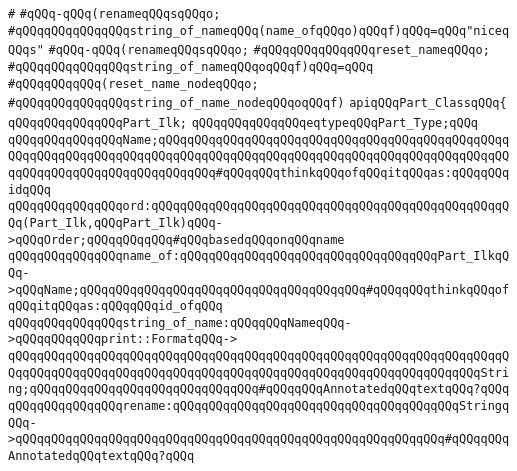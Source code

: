 \verb|#|\newline
\verb|#qQQq-qQQq(renameqQQqsqQQqo;|\newline
\verb|#qQQqqQQqqQQqqQQqstring_of_nameqQQq(name_ofqQQqo)qQQqf)qQQq=qQQq"niceqQQqs"|\newline
\verb|#qQQq-qQQq(renameqQQqsqQQqo;|\newline
\verb|#qQQqqQQqqQQqqQQqreset_nameqQQqo;|\newline
\verb|#qQQqqQQqqQQqqQQqstring_of_nameqQQqoqQQqf)qQQq=qQQq|\newline
\verb|#qQQqqQQqqQQq(reset_name_nodeqQQqo;|\newline
\verb|#qQQqqQQqqQQqqQQqstring_of_name_nodeqQQqoqQQqf)|\newline
\newline
\newline
\newline
\newline
\newline
\verb|apiqQQqPart_ClassqQQq{|\newline
\newline
\verb|qQQqqQQqqQQqqQQqPart_Ilk;|\newline
\verb|qQQqqQQqqQQqqQQqeqtypeqQQqPart_Type;qQQq|\newline
\verb|qQQqqQQqqQQqqQQqName;qQQqqQQqqQQqqQQqqQQqqQQqqQQqqQQqqQQqqQQqqQQqqQQqqQQqqQQqqQQqqQQqqQQqqQQqqQQqqQQqqQQqqQQqqQQqqQQqqQQqqQQqqQQqqQQqqQQqqQQqqQQqqQQqqQQqqQQqqQQqqQQqqQQq#qQQqqQQqthinkqQQqofqQQqitqQQqas:qQQqqQQqidqQQq|\newline
\newline
\verb|qQQqqQQqqQQqqQQqord:qQQqqQQqqQQqqQQqqQQqqQQqqQQqqQQqqQQqqQQqqQQqqQQqqQQq(Part_Ilk,qQQqPart_Ilk)qQQq->qQQqOrder;qQQqqQQqqQQq#qQQqbasedqQQqonqQQqname|\newline
\verb|qQQqqQQqqQQqqQQqname_of:qQQqqQQqqQQqqQQqqQQqqQQqqQQqqQQqqQQqPart_IlkqQQq->qQQqName;qQQqqQQqqQQqqQQqqQQqqQQqqQQqqQQqqQQqqQQq#qQQqqQQqthinkqQQqofqQQqitqQQqas:qQQqqQQqid_ofqQQq|\newline
\verb|qQQqqQQqqQQqqQQqstring_of_name:qQQqqQQqNameqQQq->qQQqqQQqqQQqprint::FormatqQQq->|\newline
\verb|qQQqqQQqqQQqqQQqqQQqqQQqqQQqqQQqqQQqqQQqqQQqqQQqqQQqqQQqqQQqqQQqqQQqqQQqqQQqqQQqqQQqqQQqqQQqqQQqqQQqqQQqqQQqqQQqqQQqqQQqqQQqqQQqqQQqqQQqString;qQQqqQQqqQQqqQQqqQQqqQQqqQQqqQQq#qQQqqQQqAnnotatedqQQqtextqQQq?qQQq|\newline
\verb|qQQqqQQqqQQqqQQqrename:qQQqqQQqqQQqqQQqqQQqqQQqqQQqqQQqqQQqqQQqStringqQQq->qQQqqQQqqQQqqQQqqQQqqQQqqQQqqQQqqQQqqQQqqQQqqQQqqQQqqQQqqQQq#qQQqqQQqAnnotatedqQQqtextqQQq?qQQq|\newline
